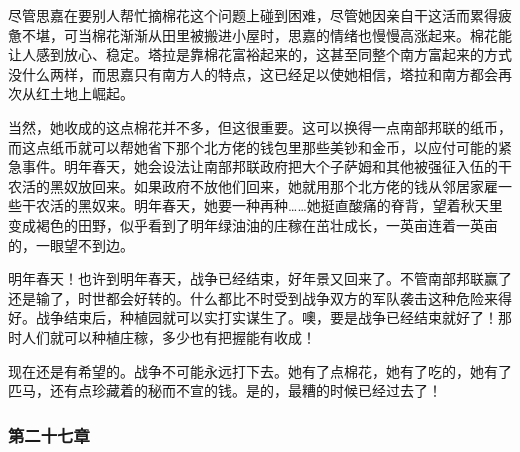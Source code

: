 \par 尽管思嘉在要别人帮忙摘棉花这个问题上碰到困难，尽管她因亲自干这活而累得疲惫不堪，可当棉花渐渐从田里被搬进小屋时，思嘉的情绪也慢慢高涨起来。棉花能让人感到放心、稳定。塔拉是靠棉花富裕起来的，这甚至同整个南方富起来的方式没什么两样，而思嘉只有南方人的特点，这已经足以使她相信，塔拉和南方都会再次从红土地上崛起。
\par 当然，她收成的这点棉花并不多，但这很重要。这可以换得一点南部邦联的纸币，而这点纸币就可以帮她省下那个北方佬的钱包里那些美钞和金币，以应付可能的紧急事件。明年春天，她会设法让南部邦联政府把大个子萨姆和其他被强征入伍的干农活的黑奴放回来。如果政府不放他们回来，她就用那个北方佬的钱从邻居家雇一些干农活的黑奴来。明年春天，她要一种再种……她挺直酸痛的脊背，望着秋天里变成褐色的田野，似乎看到了明年绿油油的庄稼在茁壮成长，一英亩连着一英亩的，一眼望不到边。
\par 明年春天！也许到明年春天，战争已经结束，好年景又回来了。不管南部邦联赢了还是输了，时世都会好转的。什么都比不时受到战争双方的军队袭击这种危险来得好。战争结束后，种植园就可以实打实谋生了。噢，要是战争已经结束就好了！那时人们就可以种植庄稼，多少也有把握能有收成！
\par 现在还是有希望的。战争不可能永远打下去。她有了点棉花，她有了吃的，她有了匹马，还有点珍藏着的秘而不宣的钱。是的，最糟的时候已经过去了！

\subsubsection{第二十七章}

